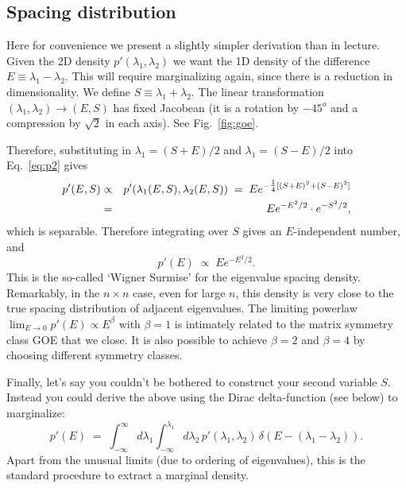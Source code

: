 \documentclass[12pt,letterpaper]{report}
\newcommand\be{\begin{equation}}
\newcommand\ee{\end{equation}}
\newcommand\bea{\begin{eqnarray}}
\newcommand\eea{\end{eqnarray}}
\newcommand\bc{\begin{center}}
\newcommand\ec{\end{center}}
\newcommand{\sfrac}[1]{\mbox{\small $\frac{1}{#1}$}}
\newcommand{\infint}{\int_{-\infty}^{\infty} \!\!}  %
\begin{document}
\subsection{Spacing distribution}

\begin{comment}
  \begin{figure}[ht]
\bc
\texttt{[image: 2x2\_GOE.eps]}
\ec \caption{Change of coordinates to get spacing distribution in
$E$. Light shading suggests form of density across the 2D plane.
Dark shading shows a graph of its projection onto the $E$ axis.}
\label{fig:goe}
\end{figure}
\end{comment}

Here for convenience we present a slightly simpler derivation than
in lecture. Given the 2D density $p'(\lambda_1,\lambda_2)$ we want
the 1D density of the difference $E \equiv \lambda_1 - \lambda_2$.
This will require marginalizing again, since there is a reduction
in dimensionality. We define $S \equiv \lambda_1 + \lambda_2$. The
linear transformation $(\lambda_1,\lambda_2) \rightarrow (E,S)$
has fixed Jacobean (it is a rotation by $-45^o$ and a compression
by $\sqrt{2}$ in each axis). See Fig.~\ref{fig:goe}.

Therefore, substituting in $\lambda_1 = (S+E)/2$ and  $\lambda_1 =
(S-E)/2$ into Eq.~\ref{eq:p2} gives \bea p'(E,S) & \propto &
p'(\lambda_1(E,S),\lambda_2(E,S)) \; = \;
E e^{-\sfrac{4}[(S+E)^2 + (S-E)^2]} \nonumber \\
& = & E e^{-E^2/2} \cdot e^{-S^2/2}, \eea which is separable.
Therefore integrating over $S$ gives an $E$-independent number,
and \be p'(E) \; \propto  \;  E e^{-E^2/2}. \ee This is the
so-called `Wigner Surmise' for the eigenvalue spacing density.
Remarkably, in the $n\times n$ case, even for large $n$, this
density is very close to the true spacing distribution of adjacent
eigenvalues. The limiting powerlaw $\lim_{E\rightarrow0} p'(E)
\propto E^\beta$ with $\beta = 1$ is intimately related to the
matrix symmetry class GOE that we close. It is also possible to
achieve $\beta = 2$ and $\beta = 4$ by choosing different symmetry
classes.

Finally, let's say you couldn't be bothered to construct your
second variable $S$. Instead you could derive the above using the
Dirac delta-function (see below) to marginalize: \be p'(E) \; = \;
\infint d\lambda_1 \int_{-\infty}^{\lambda_1} d\lambda_2 \,
p'(\lambda_1,\lambda_2) \, \delta(E - (\lambda_1 - \lambda_2)).
\ee Apart from the unusual limits (due to ordering of
eigenvalues), this is the standard procedure to extract a marginal
density.
\end{document}

